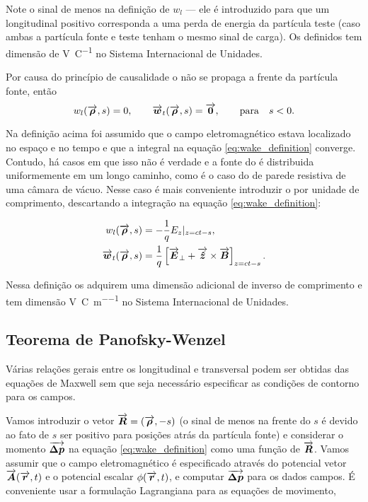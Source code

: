 Note o sinal de menos na definição de $w_l$ --- ele é introduzido para que um  longitudinal positivo corresponda a uma perda de energia da partícula teste (caso ambas a partícula fonte e teste tenham o mesmo sinal de carga). Os  definidos tem dimensão de \si{\volt\per\coulomb} no Sistema Internacional de Unidades.

Por causa do princípio de causalidade o  não se propaga a frente da partícula fonte, então
\begin{equation}
    w_l(\overrightarrow{\boldsymbol{\rho}},s) = 0, \qquad \overrightarrow{\boldsymbol{w}}_t(\overrightarrow{\boldsymbol{\rho}},s) = \overrightarrow{\boldsymbol{0}}, \qquad \mathrm{para } \quad s < 0.
\end{equation}

Na definição acima foi assumido que o campo eletromagnético estava localizado no espaço e no tempo e que a integral na equação \ref{eq:wake_definition} converge. Contudo, há casos em que isso não é verdade e a fonte do  é distribuida uniformemente em um longo caminho, como é o caso do  de parede resistiva de uma câmara de vácuo. Nesse caso é mais conveniente introduzir o  por unidade de comprimento, descartando a integração na equação \ref{eq:wake_definition}:

\begin{equation}\begin{aligned}
    w_l(\overrightarrow{\boldsymbol{\rho}},s) &= -\frac1q E_z|_{z=ct-s}, \\
    \overrightarrow{\boldsymbol{w}}_t(\overrightarrow{\boldsymbol{\rho}},s) &= \frac1q\left[\overrightarrow{\boldsymbol{E}}_\perp + \overrightarrow{\boldsymbol{\hat{z}}}\times \overrightarrow{\boldsymbol{B}}\right]_{z=ct-s}.
\end{aligned}\end{equation}

Nessa definição os  adquirem uma dimensão adicional de inverso de comprimento e tem dimensão \si{\volt\per\coulomb\per\meter} no Sistema Internacional de Unidades.

\subsection{Teorema de Panofsky-Wenzel}

Várias relações gerais entre os  longitudinal e transversal podem ser obtidas das equações de Maxwell sem que seja necessário especificar as condições de contorno para os campos.

Vamos introduzir o vetor $\overrightarrow{\boldsymbol{R}} =(\overrightarrow{\boldsymbol{\rho}},-s)$ (o sinal de menos na frente do $s$ é devido ao fato de $s$ ser positivo para posições atrás da partícula fonte) e considerar o momento $\overrightarrow{\boldsymbol{\Delta p}}$ na equação \ref{eq:wake_definition} como uma função de $\overrightarrow{\boldsymbol{R}}$. Vamos assumir que o campo eletromagnético é especificado através do potencial vetor $\overrightarrow{\boldsymbol{A}}(\overrightarrow{\boldsymbol{r}},t)$ e o potencial escalar $\phi(\overrightarrow{\boldsymbol{r}},t)$, e computar
$\overrightarrow{\boldsymbol{\Delta p}}$ para os dados campos. É conveniente usar a formulação Lagrangiana para as equações de movimento,

